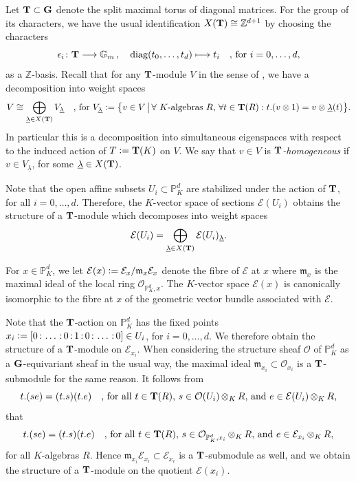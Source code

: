 \documentclass[a4paper, reqno, 10pt]{amsart}
\theoremstyle{definition}
\numberwithin{equation}{section}
\newcommand{\botimes}[1]{{\,\otimes_{#1}\,}}
\newcommand{\defeq}{\vcentcolon=}
\newcommand{\lra}{\longrightarrow}
\newcommand{\lto}{\longmapsto}
\newcommand{\ul}[1]{{\underline{#1}}}
\newcommand{\BG}{{\mathbb {G}}}
\newcommand{\BP}{{\mathbb {P}}}
\newcommand{\BZ}{{\mathbb {Z}}}
\newcommand{\CE}{{\mathcal {E}}}
\newcommand{\CO}{{\mathcal {O}}}
\newcommand{\bG}{{\mathrm{\bf G}}}
\newcommand{\bT}{{\mathrm{\bf T}}}
\newcommand{\Fm}{{\mathfrak {m}}}
\begin{document}
Let $\bT \subset \bG$ denote the split maximal torus of diagonal matrices.
For the group of its characters, we have the usual identification $X(\bT) \cong \BZ^{d+1}$ by choosing the characters
\begin{equation*}
	\epsilon_i \colon \bT \lra \BG_m \,,\quad  {\rm diag}(t_0,\ldots,t_d) \lto t_i \quad\text{, for $i=0,\ldots,d$,}
\end{equation*}
as a $\BZ$-basis.
Recall that for any $\bT$-module $V$ in the sense of \cite[I.\ \S 2.7]{Jantzen03RepAlgGrp}, we have a decomposition into weight spaces \cite[I.\ \S 2.11]{Jantzen03RepAlgGrp}
\begin{equation*}
	V \cong \bigoplus_{\ul{\lambda}\in X(\bT)} V_\ul{\lambda} \quad\text{, for $V_\ul{\lambda} \defeq \big\{v\in V \,\big\vert\, \text{$\forall$ $K$-algebras $R$, $\forall t\in \bT(R)$} :t.(v\otimes 1) = v \otimes \ul{\lambda}(t)  \big\} $.}
\end{equation*}
In particular this is a decomposition into simultaneous eigenspaces with respect to the induced action of $T\defeq \bT(K)$ on $V$.
We say that $v\in V$ is \textit{$\bT$-homogeneous} if $v\in V_\ul{\lambda}$, for some $\ul{\lambda}\in X(\bT)$.


Note that the open affine subsets $U_i \subset \BP_K^d$ are stabilized under the action of $\bT$, for all $i=0,\ldots,d$.
Therefore, the $K$-vector space of sections $\CE(U_i)$ obtains the structure of a $\bT$-module which decomposes into weight spaces
\begin{equation}\label{Eq 2 - Weight space decomposition of sections}
	\CE(U_i) = \bigoplus_{\ul{\lambda}\in X(\bT)} \CE(U_i)_\ul{\lambda} .
\end{equation}


For $x\in \BP_K^d$, we let $\CE(x) \defeq \CE_{x} / \Fm_{x} \CE_{x}$ denote the fibre of $\CE$ at $x$ where $\Fm_{x}$ is the maximal ideal of the local ring $\CO_{\BP_K^d,x}$.
The $K$-vector space $\CE(x)$ is canonically isomorphic to the fibre at $x$ of the geometric vector bundle associated with $\CE$.


Note that the $\bT$-action on $\BP_K^d$ has the fixed points $x_i \defeq [0{\,:\,}\ldots{\,:\,}0{\,:\,}1{\,:\,}0{\,:\,}\ldots{\,:\,}0] \in U_i$, for $i=0,\ldots,d$.
We therefore obtain the structure of a $\bT$-module on $\CE_{x_i}$.
When considering the structure sheaf $\CO$ of $\BP_K^d$ as a $\bG$-equivariant sheaf in the usual way, the maximal ideal $\Fm_{x_i} \subset \CO_{x_i}$ is a $\bT$-submodule for the same reason. 
It follows from 
\begin{equation}\label{Eq 2 - Action on sections and multiplication}
	t. (s e) = (t.s) (t.e) \quad\text{, for all $t\in \bT(R)$, $s\in \CO(U_i) \botimes{K} R$, and $ e \in \CE(U_i) \botimes{K} R$,}
\end{equation}
that
\begin{equation*}
	t. (s e) = (t.s) (t.e) \quad\text{, for all $t\in \bT(R)$, $s\in \CO_{\BP_K^d,x_i} \botimes{K} R$, and $ e \in \CE_{x_i} \botimes{K} R$,}
\end{equation*}
for all $K$-algebras $R$.
Hence $\Fm_{x_i} \CE_{x_i} \subset \CE_{x_i}$ is a $\bT$-submodule as well, and we obtain the structure of a $\bT$-module on the quotient $\CE(x_i)$.
\end{document}
